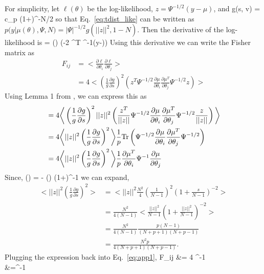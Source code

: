 For simplicity, let $\ell(\theta)$ be the log-likelihood, $z = \Psi^{-1/2} (y - \mu)$, and 
\beq
g(s, v) = c_p \left(1+\right)^{-N/2}
\eeq
so that Eq.~\ref{eq:tdist_like} can be written as $p(y|\mu(\theta),\Psi,N) = |\Psi|^{-1/2} g(||z||^2, 1-N)$.
Then the derivative of the log-likelihood is  
\beq
{} = \left(\right) \left(-2 ^T \Psi^{-1}(y-\mu)\right) 
\eeq
Using this derivative we can write the Fisher matrix as  
\begin{align}
F_{ij} &= \bigg<\frac{\partial \ell}{\partial \theta_i} \frac{\partial \ell}{\partial \theta_j}\bigg> \\ 
&= 4\bigg< \left(\frac{1}{g}\frac{\partial g}{\partial s}\right)^2
\left(z^T\Psi^{-1/2}\frac{\partial \mu}{\partial \theta_i} \frac{\partial \mu^T}{\partial \theta_j}\Psi^{-1/2} z \right)\bigg> 
\end{align}
Using Lemma 1 from \cite{lange1989}, we can express this as 
\begin{align} \label{eq:app1}
&= 4\bigg< \left(\frac{1}{g}\frac{\partial g}{\partial s}\right)^2
||z||^2 \left(\frac{z^T}{||z||}\Psi^{-1/2}\frac{\partial \mu}{\partial \theta_i} \frac{\partial \mu^T}{\partial \theta_j}\Psi^{-1/2}\frac{z}{||z||} \right)\bigg> \\
&= 4\bigg<||z||^2 \left(\frac{1}{g}\frac{\partial g}{\partial s}\right)^2 \bigg>
\frac{1}{p} {\rm Tr}\left(\Psi^{-1/2}\frac{\partial \mu}{\partial \theta_i} \frac{\partial \mu^T}{\partial \theta_j}\Psi^{-1/2}\right) \\
&= 4\bigg<||z||^2 \left(\frac{1}{g}\frac{\partial g}{\partial s}\right)^2 \bigg> \frac{1}{p}\frac{\partial \mu^T}{\partial \theta_i}\Psi^{-1}\frac{\partial \mu}{\partial \theta_j}
\end{align}
Since, 
\beq
\left(\right) = - \left(\right) \left(1+\right)^{-1} 
\eeq
we can expand, 
\begin{align}
\bigg<||z||^2 \left(\frac{1}{g}\frac{\partial g}{\partial s}\right)^2 \bigg> &= \bigg<||z||^2 \frac{N^2}{4} \left(\frac{1}{N-1}\right)^2 \left(1+\frac{s}{N-1}\right)^{-2} \bigg> \\
&= \frac{N^2}{4(N-1)}\bigg<\frac{||z||^2}{N-1} \left(1+\frac{||z||^2}{N-1}\right)^{-2} \bigg>\\
&= \frac{N^2}{4(N-1)}\frac{p (N-1)}{(N+p+1)(N+p-1)}\\
&= \frac{N^2 p}{4(N+p+1)(N+p-1)}.
\end{align}
Plugging the expression back into Eq.~\ref{eq:app1}, 
\beg
F_{ij} &= 4 \Psi^{-1} \\
&=\Psi^{-1}
\eeq

